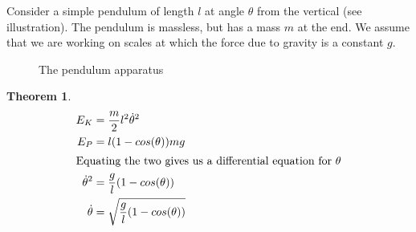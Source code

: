 \documentclass{article}
\newtheorem{theorem}{Theorem}[section]
\begin{document}
Consider a simple pendulum of length $l$ at angle $\theta$ from the vertical (see illustration). The pendulum is massless, but has a mass $m$ at the end. We assume that we are working on scales at which the force due to gravity is a constant  $g$.  

\begin{figure}[h]

  
  \caption{The pendulum apparatus}
  
\end{figure}

\begin{theorem}
  \begin{align}
    E_{K} &= \frac{m}{2}l^2\dot{\theta}^2 \\
    E_{P} &= l(1 - cos(\theta))mg \\
\intertext{Equating the two gives us a differential equation for $\theta$}
\dot{\theta}^2 & =  \frac{g}{l}(1 - cos(\theta)) \\
\dot{\theta} &= \sqrt{\frac{g}{l}(1 - cos(\theta))}
  \end{align}
\end{theorem}
\end{document}
